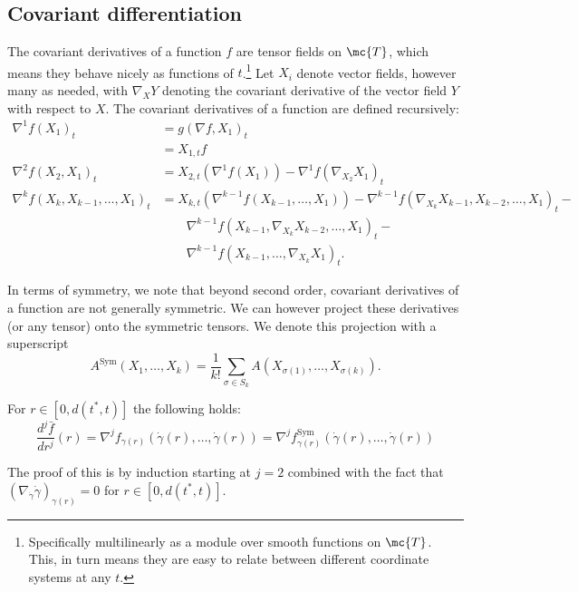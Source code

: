 \documentclass{article}
\begin{document}
\subsection{Covariant differentiation}

The covariant derivatives of a function $f$ are tensor fields on $\mc{T}$, which means they behave nicely
as functions of $t$.\footnote{Specifically multilinearly as a module over smooth functions on $\mc{T}$. This,
in turn means they are easy to relate between different coordinate systems at any $t$.}
Let $X_i$ denote vector fields, however many as needed, with $\nabla_XY$ denoting
the covariant derivative of the vector field $Y$ with respect to $X$. The covariant
derivatives of a function are defined recursively:
$$
\begin{aligned}
  \nabla^1 f(X_1)_t &= g(\nabla f, X_1)_t \\
  &= X_{1,t}f \\
  \nabla^2 f(X_2, X_1)_t &= X_{2,t}(\nabla^1 f(X_1)) - \nabla^1 f(\nabla_{X_2}X_1)_t \\
  \nabla^k f(X_k, X_{k-1}, \dots, X_1)_t &= X_{k,t}(\nabla^{k-1} f(X_{k-1}, \dots, X_1)) -
  \nabla^{k-1} f(\nabla_{X_k}X_{k-1}, X_{k-2}, \dots, X_1)_t - \\
&  \qquad   \nabla^{k-1} f(X_{k-1}, \nabla_{X_k}X_{k-2}, \dots, X_1)_t - \\
  & \qquad \nabla^{k-1} f(X_{k-1}, \dots, \nabla_{X_k}X_1)_t.
  \end{aligned}
$$

In terms of symmetry, we note that beyond second order, covariant derivatives of a function are not generally symmetric. We can however project these derivatives
(or any tensor) 
onto the symmetric tensors. We denote this projection with a superscript
$$
A^{\mathrm{Sym}}(X_1, \dots, X_k) = \frac{1}{k!} \sum_{\sigma \in S_k} A(X_{\sigma(1)}, \dots, X_{\sigma(k)}).
$$

\begin{lemma}
\label{lem:geodesic}
  For $r \in [0, d(t^*,t)]$ the following holds:
  $$
\frac{d^j\bar{f}}{dr^j}(r) = \nabla^j f_{\gamma(r)}(\dot{\gamma}(r), \dots, \dot{\gamma}(r)) =  \nabla^j f_{\gamma(r)}^{\mathrm{Sym}}(\dot{\gamma}(r), \dots, \dot{\gamma}(r))
  $$
  \end{lemma}
The proof of this is by induction starting at $j=2$ combined with the fact that $(\nabla_{\dot{\gamma}}\dot{\gamma})_{\gamma(r)}=0$ for $r \in [0, d(t^*,t)]$.
\end{document}
